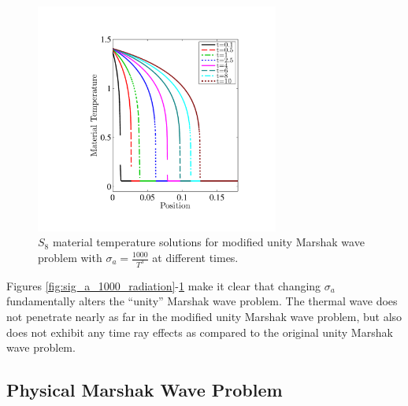 \begin{figure}[!hbp]
\centering
\includegraphics[width=8cm,trim=1in  0.6in 1.0in 0.75in,clip=true]{chapter6_grey_radtran/Dissertation_Data/More_Times_P1_S8_Time_Ray_Effects_Temperature_Cv1_SigA1000.pdf}
\caption{$S_{8}$ material temperature solutions for modified unity Marshak wave problem with $\sigma_a = \frac{1000}{T^3}$ at different times.}
\label{fig:sig_a_1000_temperature}
\end{figure}
Figures \ref{fig:sig_a_1000_radiation}-\ref{fig:sig_a_1000_temperature} make it clear that changing $\sigma_a$ fundamentally alters the ``unity'' Marshak wave problem.
The thermal wave does not penetrate nearly as far in the modified unity Marshak wave problem, but also does not exhibit any time ray effects as compared to the original unity Marshak wave problem.

\subsection{Physical Marshak Wave Problem}

